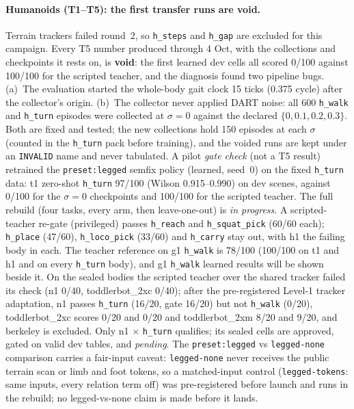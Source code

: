 \documentclass[10pt,twocolumn]{article}
\begin{document}
\paragraph{Humanoids (T1--T5): the first transfer runs are void.} Terrain trackers failed round~2, so \texttt{h\_steps} and \texttt{h\_gap} are excluded for this campaign. Every T5 number produced through 4 Oct, with the collections and checkpoints it rests on, is \textbf{void}: the first learned dev cells all scored 0/100 against 100/100 for the scripted teacher, and the diagnosis found two pipeline bugs. (a)~The evaluation started the whole-body gait clock 15 ticks (0.375 cycle) after the collector's origin. (b)~The collector never applied DART noise: all 600 \texttt{h\_walk} and \texttt{h\_turn} episodes were collected at $\sigma{=}0$ against the declared $\{0, 0.1, 0.2, 0.3\}$. Both are fixed and tested; the new collections hold 150 episodes at each $\sigma$ (counted in the \texttt{h\_turn} pack before training), and the voided runs are kept under an \texttt{INVALID} name and never tabulated. A pilot \emph{gate check} (not a T5 result) retrained the \texttt{preset:legged} semfix policy (learned, seed~0) on the fixed \texttt{h\_turn} data: t1 zero-shot \texttt{h\_turn} 97/100 (Wilson 0.915--0.990) on dev scenes, against 0/100 for the $\sigma{=}0$ checkpoints and 100/100 for the scripted teacher. The full rebuild (four tasks, every arm, then leave-one-out) is \emph{in progress}. A scripted-teacher re-gate (privileged) passes \texttt{h\_reach} and \texttt{h\_squat\_pick} (60/60 each); \texttt{h\_place} (47/60), \texttt{h\_loco\_pick} (33/60) and \texttt{h\_carry} stay out, with h1 the failing body in each. The teacher reference on g1 \texttt{h\_walk} is 78/100 (100/100 on t1 and h1 and on every \texttt{h\_turn} body), and g1 \texttt{h\_walk} learned results will be shown beside it. On the sealed bodies the scripted teacher over the shared tracker failed its check (n1 0/40, toddlerbot\_2xc 0/40); after the pre-registered Level-1 tracker adaptation, n1 passes \texttt{h\_turn} (16/20, gate 16/20) but not \texttt{h\_walk} (0/20), toddlerbot\_2xc scores 0/20 and 0/20 and toddlerbot\_2xm 8/20 and 9/20, and berkeley is excluded. Only n1 $\times$ \texttt{h\_turn} qualifies; its sealed cells are approved, gated on valid dev tables, and \emph{pending}. The \texttt{preset:legged} vs \texttt{legged-none} comparison carries a fair-input caveat: \texttt{legged-none} never receives the public terrain scan or limb and foot tokens, so a matched-input control (\texttt{legged-tokens}: same inputs, every relation term off) was pre-registered before launch and runs in the rebuild; no legged-vs-none claim is made before it lands.
\end{document}
